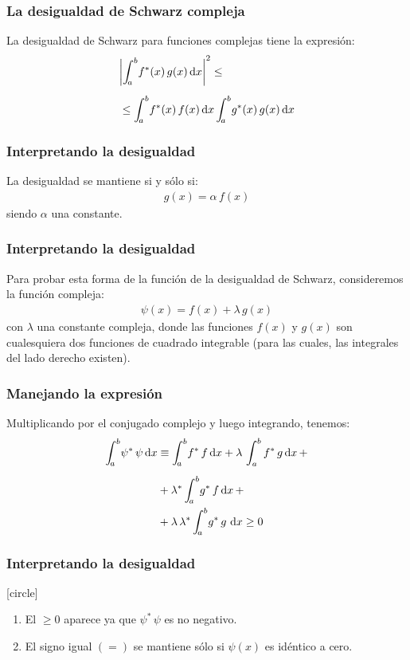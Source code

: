 \documentclass[12pt]{beamer}
\begin{document}
\begin{frame}
\frametitle{La desigualdad de Schwarz compleja}
La desigualdad de Schwarz para funciones complejas tiene la expresión:
\pause
\begin{align}
\begin{aligned}[b]
&\abs{ \scaleint{5ex}_{\bs a}^{b} f^{*} (x) \, g (x) \dd{x} }^{2} \leq \\[0.5em]
&\leq \scaleint{5ex}_{\bs a}^{b} f^{*} (x) \, f (x) \dd{x} \scaleint{5ex}_{\bs a}^{b} g^{*} (x) \, g (x) \dd{x}
\end{aligned}
\label{eq:ecuacion_10_78}
\end{align}
\end{frame}
\begin{frame}
\frametitle{Interpretando la desigualdad}
La desigualdad se mantiene si y sólo si:
\begin{align*}
g (x) = \alpha \, f (x)
\end{align*}
siendo $\alpha$ una constante.
\end{frame}
\begin{frame}
\frametitle{Interpretando la desigualdad}
Para probar esta forma de la función de la desigualdad de Schwarz, consideremos la función compleja:
\pause
\begin{align*}
\psi (x) = f(x) + \lambda \, g (x)
\end{align*}
con $\lambda$ una constante compleja, donde las funciones $f (x)$ y $g (x)$ son cualesquiera dos funciones de cuadrado integrable (para las cuales, las integrales del lado derecho existen).
\end{frame}
\begin{frame}
\frametitle{Manejando la expresión}
Multiplicando por el conjugado complejo y luego integrando, tenemos:
\pause
\begin{align}
\begin{aligned}
\scaleint{5ex}_{\bs a}^{b} \psi^{*} \, \psi \dd{x} &\equiv \scaleint{5ex}_{\bs a}^{b} f^{*} \, f \dd{x} + \lambda \, \int_{a}^{b} f^{*} \, g \dd{x} + \\[0.5em]
&+ \lambda^{*} \, \scaleint{5ex}_{\bs a}^{b} g^{*} \, f \dd{x} + \\
&+ \lambda \, \lambda^{*} \, \scaleint{5ex}_{\bs a}^{b} g^{*} \, g \, \dd{x}  \geq 0
\end{aligned}
\label{eq:ecuacion_10_79}
\end{align}
\end{frame}
\begin{frame}
\frametitle{Interpretando la desigualdad}
[circle]
\begin{enumerate}[<+->]
\item El $\geq 0$ aparece ya que $\psi^{*} \, \psi$ es no negativo.
\item El signo igual $(=)$ se mantiene sólo si $\psi (x)$ es idéntico a cero.
\end{enumerate}
\end{frame}
\end{document}
